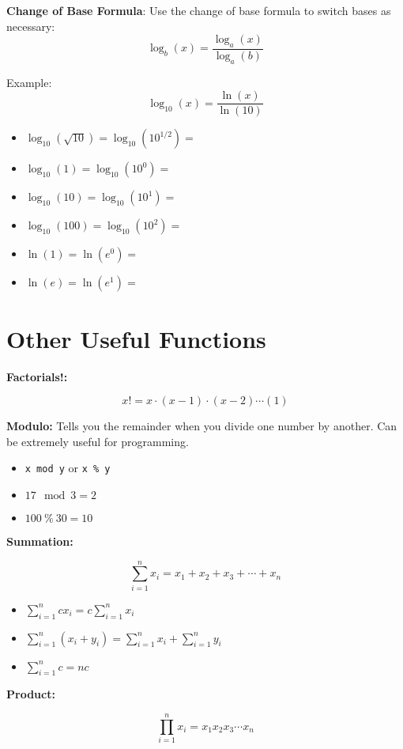 \documentclass[]{book}
\providecommand{\tightlist}{%
  \setlength{\itemsep}{0pt}\setlength{\parskip}{0pt}}
\theoremstyle{definition}
\theoremstyle{definition}
\theoremstyle{definition}
\theoremstyle{remark}
\begin{document}
\textbf{Change of Base Formula}: Use the change of base formula to
switch bases as necessary: \[\log_b(x) = \frac{\log_a(x)}{\log_a(b)}\]

Example: \[\log_{10}(x) = \frac{\ln(x)}{\ln(10)}\]

\begin{itemize}
\item $\log_{10}(\sqrt{10})=\log_{10}(10^{1/2}) = $
\item $\log_{10}(1)=\log_{10}(10^{0}) = $
\item $\log_{10}(10)=\log_{10}(10^{1}) = $
\item $\log_{10}(100)=\log_{10}(10^{2}) = $
\item $\ln(1)=\ln(e^{0}) = $
\item $\ln(e)=\ln(e^{1}) = $
\end{itemize}

\section{Other Useful Functions}\label{other-useful-functions}

\textbf{Factorials!:}

\[x! = x\cdot (x-1) \cdot (x-2) \cdots (1)\]

\textbf{Modulo:} Tells you the remainder when you divide one number by
another. Can be extremely useful for programming.

\begin{itemize}
\tightlist
\item
  \texttt{x mod y} or \texttt{x \% y}
\item
  \(17 \mod 3 = 2\)
\item
  \(100 \ \% \ 30 = 10\)
\end{itemize}

\textbf{Summation:}

\[\sum\limits_{i=1}^n x_i = x_1+x_2+x_3+\cdots+x_n\]

\begin{itemize}
\item $\sum\limits_{i=1}^n c x_i = c \sum\limits_{i=1}^n x_i $
\item $\sum\limits_{i=1}^n (x_i + y_i) =  \sum\limits_{i=1}^n x_i + \sum\limits_{i=1}^n y_i $
\item $\sum\limits_{i=1}^n c = n c $
\end{itemize}

\textbf{Product:}

\[\prod\limits_{i=1}^n x_i = x_1 x_2 x_3 \cdots x_n\]
\end{document}
